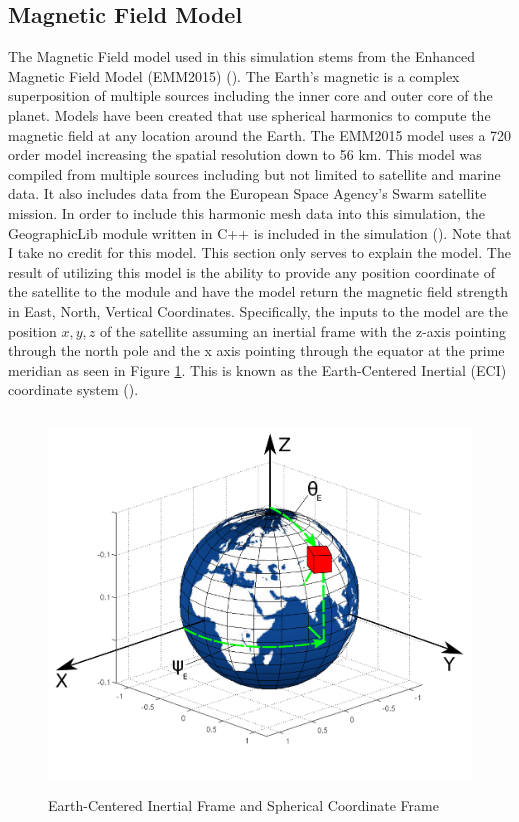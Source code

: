 \documentclass{article}
\begin{document}
\subsection{Magnetic Field Model}\label{s:magnetic_field}

The Magnetic Field model used in this simulation stems from the
Enhanced Magnetic Field Model (EMM2015) (\cite{EMM2015}). The Earth's magnetic is a
complex superposition of multiple sources including the inner core and
outer core of the planet. Models have been created that use spherical
harmonics to compute the magnetic field at any location around the
Earth. The EMM2015 model uses a 720 order model increasing the spatial
resolution down to 56 km. This model was compiled from multiple
sources including but not limited to satellite and marine data. It
also includes data from the European Space Agency's Swarm satellite
mission. In order to include this harmonic mesh data into this simulation,
the GeographicLib module written in C++ is included in the
simulation (\cite{GeographicLib}). Note that I take no credit for this
model. This section only serves to explain the model. The result of
utilizing this model is the ability to provide any position coordinate
of the satellite to the module and have
the model return the magnetic field strength in East, North, Vertical
Coordinates. Specifically, the inputs to the model are 
the position $x,y,z$ of the satellite assuming an inertial frame with
the z-axis pointing through the north pole and the x axis pointing
through the equator at the prime meridian as seen in Figure
\ref{f:spherical}. This is known as the Earth-Centered Inertial
(ECI) coordinate system (\cite{ECI}).
\begin{figure}[H]
  \begin{center}
  \includegraphics[height=100mm, width=120mm]{Figures/ECI.pdf}
  \end{center}
  \caption{Earth-Centered Inertial Frame and Spherical Coordinate Frame}\label{f:spherical}
\end{figure}
\end{document}
